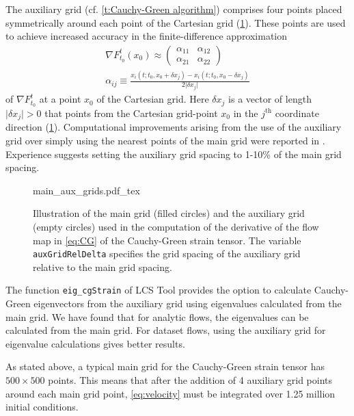 \documentclass[5p]{elsarticle}
\begin{document}
The auxiliary grid (cf. \cref{t:Cauchy-Green algorithm}) comprises four points placed symmetrically around each point of the Cartesian grid (\cref{f:main and auxiliary grids}). These points are used to achieve increased accuracy in the finite-difference approximation
\begin{gather*}
\nabla F_{t_0}^t(x_0) \approx
\left(\begin{array}{cc}
\alpha_{11} & \alpha_{12}
\\
\alpha_{21} & \alpha_{22}
\end{array}\right)
\\
\alpha_{ij} \equiv \frac{x_i(t;t_0,x_0+\delta x_j) - x_i(t;t_0,x_0-\delta x_j)}{2\vert\delta x_j\vert}
\end{gather*}
of $\nabla F_{t_0}^t$ at a point $x_0$ of the Cartesian grid. Here $\delta x_j$ is a vector of length $\vert\delta x_j\vert > 0$ that points from the Cartesian grid-point $x_0$ in the $j^\text{th}$ coordinate direction (\cref{f:main and auxiliary grids}). Computational improvements arising from the use of the auxiliary grid over simply using the nearest points of the main grid were reported in \citet{farazmand12:_comput_lagran}. Experience suggests setting the auxiliary grid spacing to 1-10\% of the main grid spacing.

\begin{figure}
\begin{center}
\def\svgwidth{.325\textwidth}
{main_aux_grids.pdf_tex}
\end{center}
\caption{Illustration of the main grid (filled circles) and the auxiliary grid (empty circles) used in the computation of the derivative of the flow map in \cref{eq:CG} of the Cauchy-Green strain tensor. The variable \lstinline!auxGridRelDelta! specifies the grid spacing of the auxiliary grid relative to the main grid spacing.}
\label{f:main and auxiliary grids}
\end{figure}

The function \lstinline!eig_cgStrain! of LCS Tool provides the option to calculate Cauchy-Green eigenvectors from the auxiliary grid using eigenvalues calculated from the main grid.
We have found that for analytic flows, the eigenvalues can be calculated from the main grid.
For dataset flows, using the auxiliary grid for eigenvalue calculations gives better results.

As stated above, a typical main grid for the Cauchy-Green strain tensor has $500 \times 500$ points.
This means that after the addition of 4 auxiliary grid points around each main grid point, \cref{eq:velocity} must be integrated over 1.25 million initial conditions.
\end{document}
